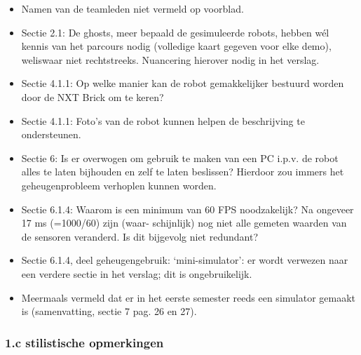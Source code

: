 \documentclass[12pt,a4paper]{report}
\begin{document}
 
\begin{itemize}
 \item Namen van de teamleden niet vermeld op voorblad.
 \item Sectie 2.1: De ghosts, meer bepaald de gesimuleerde robots, hebben w\'el kennis van het parcours nodig (volledige
kaart gegeven voor elke demo), weliswaar niet rechtstreeks. Nuancering hierover nodig in het verslag.
 \item Sectie 4.1.1: Op welke manier kan de robot gemakkelijker bestuurd worden door de NXT Brick om te keren?
 \item Sectie 4.1.1: Foto's van de robot kunnen helpen de beschrijving te ondersteunen.
 \item Sectie 6: Is er overwogen om gebruik te maken van een PC i.p.v. de robot alles te laten bijhouden en zelf te
laten beslissen? Hierdoor zou immers het geheugenprobleem verhoplen kunnen worden.
 \item Sectie 6.1.4: Waarom is een minimum van 60 FPS noodzakelijk? Na ongeveer 17 ms (=1000/60) zijn (waar-
schijnlijk) nog niet alle gemeten waarden van de sensoren veranderd. Is dit bijgevolg niet redundant?
\item Sectie 6.1.4, deel geheugengebruik: `mini-simulator': er wordt verwezen naar een verdere sectie in het verslag;
dit is ongebruikelijk.
\item Meermaals vermeld dat er in het eerste semester reeds een simulator gemaakt is (samenvatting, sectie 7 pag. 26
en 27).
\end{itemize}

   \subsubsection{1.c stilistische opmerkingen}
\end{document}
